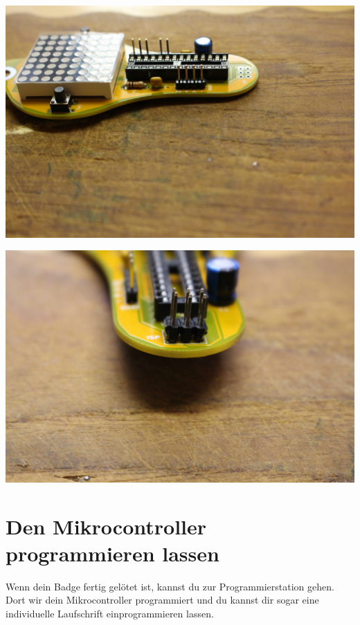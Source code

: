 \documentclass{article}
\begin{document}
\begin{minipage}[b]{0.5\textwidth}
	\includegraphics[width=\textwidth]{Bilder/IMG_5612.JPG}
\end{minipage}
\begin{minipage}[b]{0.5\textwidth}
	\includegraphics[width=\textwidth]{Bilder/IMG_5616.JPG}
\end{minipage}

\section{Den Mikrocontroller programmieren lassen}

Wenn dein Badge fertig gelötet ist, kannst du zur Programmierstation gehen. Dort wir dein Mikrocontroller programmiert und du kannst dir sogar eine individuelle Laufschrift einprogrammieren lassen.
\end{document}
